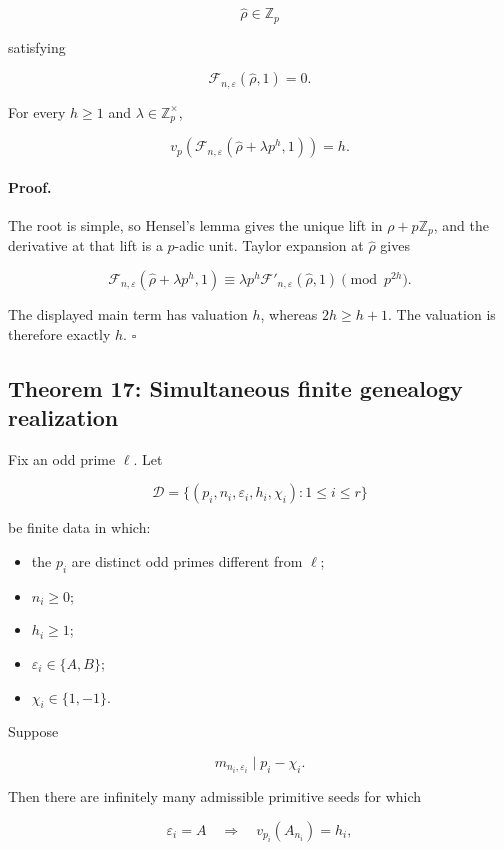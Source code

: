 \documentclass[11pt]{article}
\begin{document}
\[
\widehat\rho\in\mathbb Z_p
\]

satisfying

\[
\mathcal F_{n,\varepsilon}(\widehat\rho,1)=0.
\]

For every \(h\geq1\) and \(\lambda\in\mathbb Z_p^\times\),

\[
v_p\left(
\mathcal F_{n,\varepsilon}
(\widehat\rho+\lambda p^h,1)
\right)
=
h.
\]

\paragraph{Proof.}

The root is simple, so Hensel's lemma gives the unique lift in
\(\rho+p\mathbb Z_p\), and the derivative at that lift is a \(p\)-adic
unit. Taylor expansion at \(\widehat\rho\) gives

\[
\mathcal F_{n,\varepsilon}
(\widehat\rho+\lambda p^h,1)
\equiv
\lambda p^h
\mathcal F'_{n,\varepsilon}(\widehat\rho,1)
\pmod{p^{2h}}.
\]

The displayed main term has valuation \(h\), whereas
\(2h\geq h+1\). The valuation is therefore exactly \(h\). \(\square\)

\subsection{Theorem 17: Simultaneous finite genealogy realization}

Fix an odd prime \(\ell\). Let

\[
\mathcal D
=
\{
(p_i,n_i,\varepsilon_i,h_i,\chi_i):
1\leq i\leq r
\}
\]

be finite data in which:

\begin{itemize}
\item the \(p_i\) are distinct odd primes different from \(\ell\);
\item \(n_i\geq0\);
\item \(h_i\geq1\);
\item \(\varepsilon_i\in\{A,B\}\);
\item \(\chi_i\in\{1,-1\}\).
\end{itemize}

Suppose

\[
m_{n_i,\varepsilon_i}
\mid
p_i-\chi_i.
\]

Then there are infinitely many admissible primitive seeds for which

\[
\varepsilon_i=A
\quad\Longrightarrow\quad
v_{p_i}(A_{n_i})=h_i,
\]
\end{document}

